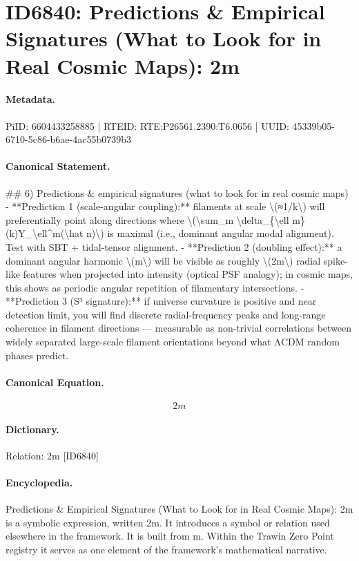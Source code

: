 \section*{ID6840: Predictions \& Empirical Signatures (What to Look for in Real Cosmic Maps): 2m}
\paragraph{Metadata.}
PiID: 6604433258885 | RTEID: RTE:P26561.2390:T6.0656 | UUID: 45339b05-6710-5c86-b6ae-4ac55b0739b3

\paragraph{Canonical Statement.}
\#\# 6) Predictions \& empirical signatures (what to look for in real cosmic maps) - **Prediction 1 (scale-angular coupling):** filaments at scale \textbackslash{}(≈1/k\textbackslash{}) will preferentially point along directions where \textbackslash{}(\textbackslash{}sum\_m \textbackslash{}delta\_\{\textbackslash{}ell m\}(k)Y\_\textbackslash{}ell\textasciicircum{}m(\textbackslash{}hat n)\textbackslash{}) is maximal (i.e., dominant angular modal alignment). Test with SBT + tidal-tensor alignment. - **Prediction 2 (doubling effect):** a dominant angular harmonic \textbackslash{}(m\textbackslash{}) will be visible as roughly \textbackslash{}(2m\textbackslash{}) radial spike-like features when projected into intensity (optical PSF analogy); in cosmic maps, this shows as periodic angular repetition of filamentary intersections. - **Prediction 3 (S³ signature):** if universe curvature is positive and near detection limit, you will find discrete radial-frequency peaks and long-range coherence in filament directions — measurable as non-trivial correlations between widely separated large-scale filament orientations beyond what ΛCDM random phases predict.

\paragraph{Canonical Equation.}
\[
2m
\]

\paragraph{Dictionary.}
Relation: 2m [ID6840]

\paragraph{Encyclopedia.}
Predictions \& Empirical Signatures (What to Look for in Real Cosmic Maps): 2m is a symbolic expression, written 2m. It introduces a symbol or relation used elsewhere in the framework. It is built from m. Within the Trawin Zero Point registry it serves as one element of the framework's mathematical narrative.

